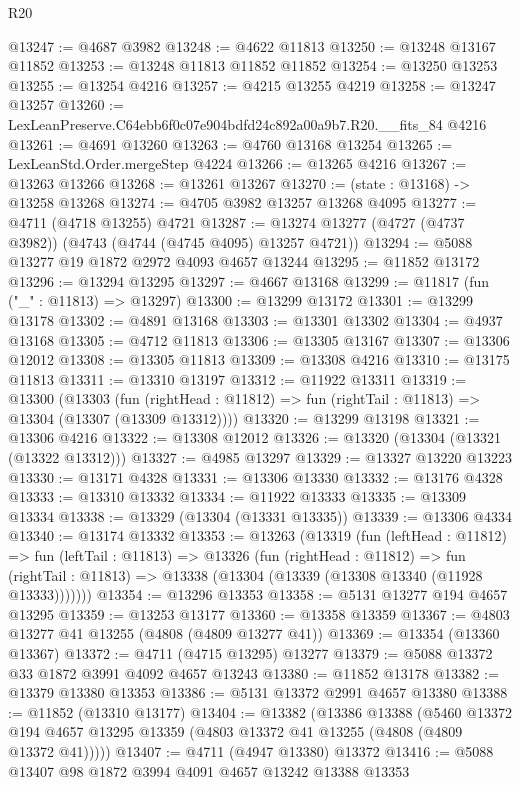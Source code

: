 \begin{lexlean}{R20}
\begin{coremodule}
@13247 := @4687 @3982
@13248 := @4622 @11813
@13250 := @13248 @13167 @11852
@13253 := @13248 @11813 @11852 @11852
@13254 := @13250 @13253
@13255 := @13254 @4216
@13257 := @4215 @13255 @4219
@13258 := @13247 @13257
@13260 := LexLeanPreserve.C64ebb6f0c07e904bdfd24c892a00a9b7.R20.__fits_84 @4216
@13261 := @4691 @13260
@13263 := @4760 @13168 @13254
@13265 := LexLeanStd.Order.mergeStep @4224
@13266 := @13265 @4216
@13267 := @13263 @13266
@13268 := @13261 @13267
@13270 := (state : @13168) -> @13258 @13268
@13274 := @4705 @3982 @13257 @13268 @4095
@13277 := @4711 (@4718 @13255) @4721
@13287 := @13274 @13277 (@4727 (@4737 @3982)) (@4743 (@4744 (@4745 @4095) @13257 @4721))
@13294 := @5088 @13277 @19 @1872 @2972 @4093 @4657 @13244
@13295 := @11852 @13172
@13296 := @13294 @13295
@13297 := @4667 @13168
@13299 := @11817 (fun ("_" : @11813) => @13297)
@13300 := @13299 @13172
@13301 := @13299 @13178
@13302 := @4891 @13168
@13303 := @13301 @13302
@13304 := @4937 @13168
@13305 := @4712 @11813
@13306 := @13305 @13167
@13307 := @13306 @12012
@13308 := @13305 @11813
@13309 := @13308 @4216
@13310 := @13175 @11813
@13311 := @13310 @13197
@13312 := @11922 @13311
@13319 := @13300
    (@13303
      (fun (rightHead : @11812) => fun (rightTail : @11813) => @13304 (@13307 (@13309 @13312))))
@13320 := @13299 @13198
@13321 := @13306 @4216
@13322 := @13308 @12012
@13326 := @13320 (@13304 (@13321 (@13322 @13312)))
@13327 := @4985 @13297
@13329 := @13327 @13220 @13223
@13330 := @13171 @4328
@13331 := @13306 @13330
@13332 := @13176 @4328
@13333 := @13310 @13332
@13334 := @11922 @13333
@13335 := @13309 @13334
@13338 := @13329 (@13304 (@13331 @13335))
@13339 := @13306 @4334
@13340 := @13174 @13332
@13353 := @13263
    (@13319
      (fun (leftHead : @11812) =>
      fun (leftTail : @11813) =>
      @13326
        (fun (rightHead : @11812) =>
        fun (rightTail : @11813) => @13338 (@13304 (@13339 (@13308 @13340 (@11928 @13333)))))))
@13354 := @13296 @13353
@13358 := @5131 @13277 @194 @4657 @13295
@13359 := @13253 @13177
@13360 := @13358 @13359
@13367 := @4803 @13277 @41 @13255 (@4808 (@4809 @13277 @41))
@13369 := @13354 (@13360 @13367)
@13372 := @4711 (@4715 @13295) @13277
@13379 := @5088 @13372 @33 @1872 @3991 @4092 @4657 @13243
@13380 := @11852 @13178
@13382 := @13379 @13380 @13353
@13386 := @5131 @13372 @2991 @4657 @13380
@13388 := @11852 (@13310 @13177)
@13404 := @13382
    (@13386
      @13388
      (@5460 @13372 @194 @4657 @13295 @13359 (@4803 @13372 @41 @13255 (@4808 (@4809 @13372 @41)))))
@13407 := @4711 (@4947 @13380) @13372
@13416 := @5088 @13407 @98 @1872 @3994 @4091 @4657 @13242 @13388 @13353

\end{coremodule}
\end{lexlean}
